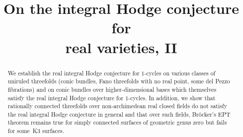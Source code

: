 \documentclass[JEP,XML,SOM,Unicode]{cedram}
\theoremstyle{plain}
\theoremstyle{definition}
\numberwithin{equation}{section}
\begin{document}
\frontmatter

\title[On the integral Hodge conjecture for real varieties, II]{On the integral Hodge conjecture for\\ real varieties, II}

\author[\initial{O.} \lastname{Benoist}]{ }
\address{Institut de Recherche Mathématique Avancée,
UMR 7501, Université de Strasbourg et CNRS\\
7 rue René Descartes,
67000 Strasbourg, France}

\author[\initial{O.} \lastname{Wittenberg}]{ }
\address{Département de mathématiques et applications, \'Ecole normale supérieure\\
45 rue d'Ulm, 75230 Paris Cedex 05, France}

\begin{abstract}
We establish the real integral Hodge conjecture for $1$\nobreakdash-cycles on various classes of uniruled threefolds (conic bundles, Fano threefolds with no real point, some del Pezzo fibrations) and on conic bundles over higher-dimensional bases which themselves satisfy the real integral Hodge conjecture for $1$\nobreakdash-cycles. In addition, we show that rationally connected threefolds over non-archimedean real closed fields do not satisfy the real integral Hodge conjecture in general and that over such fields, Bröcker's EPT theorem remains true for simply connected surfaces of geometric genus zero but fails for some~K3 surfaces.
\end{abstract}




\end{document}
